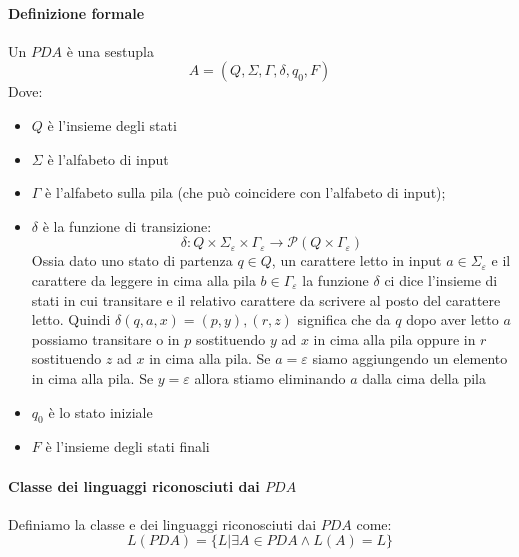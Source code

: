 \paragraph{Definizione formale}
Un $PDA$ è una sestupla
\[A = (Q, \Sigma, \Gamma, \delta, q_0, F)\]
Dove:
\begin{itemize}
	\item $Q$ è l'insieme degli stati
	\item $\Sigma$ è l'alfabeto di input
	\item $\Gamma$ è l'alfabeto sulla pila (che può coincidere con l'alfabeto di input);
	\item $\delta$ è la funzione di transizione: 
	$$\delta : Q \times \Sigma_{\varepsilon} \times \Gamma_{\varepsilon} \to \mathcal{P} ( Q \times \Gamma_{\varepsilon} )$$ Ossia dato uno stato di partenza $q \in Q$, un carattere letto in input $a \in \Sigma_{\varepsilon}$ e il carattere da leggere in cima alla pila $b \in \Gamma_{\varepsilon}$ la funzione $\delta$ ci dice l'insieme di stati in cui transitare e il relativo carattere da scrivere al posto del carattere letto. Quindi $\delta(q,a,x) = {(p,y), (r,z)}$ significa che da $q$ dopo aver letto $a$ possiamo transitare o in $p$ sostituendo $y$ ad $x$ in cima alla pila oppure in $r$ sostituendo $z$ ad $x$ in cima alla pila. Se $a = \varepsilon$ siamo aggiungendo un elemento in cima alla pila. Se $y = \varepsilon$ allora stiamo eliminando $a$ dalla cima della pila
	\item $q_0$ è lo stato iniziale
	\item $F$ è l'insieme degli stati finali
\end{itemize}

\paragraph{Classe dei linguaggi riconosciuti dai $PDA$}
Definiamo la classe e dei linguaggi riconosciuti dai $PDA$ come:
$$L(PDA) = \{L | \exists A \in PDA \land L(A) = L\}$$
